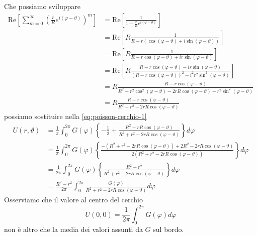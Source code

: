 \documentclass[10pt,a4paper,twoside,openright]{book}
\begin{document}
\begin{dimostrazione}
\begin{equation*}
\end{equation*}
Che possiamo sviluppare
\begin{align*}
\mathrm{Re}\left[\sum\limits ^{\infty }_{m=0}\left(\frac{r}{R} e^{i( \varphi -\vartheta)}\right)^{m}\right] & =\mathrm{Re}\left[\frac{1}{1-\frac{r}{R} e^{i( \varphi -\vartheta)}}\right]\\
 & =\mathrm{Re}\left[ R\frac{1}{R-r(\cos( \varphi -\vartheta) +i\sin( \varphi -\vartheta))}\right]\\
 & =\mathrm{Re}\left[ R\frac{1}{R-r\cos( \varphi -\vartheta) +ir\sin( \varphi -\vartheta)}\right]\\
 & =\mathrm{Re}\left[ R\frac{R-r\cos( \varphi -\vartheta) -ir\sin( \varphi -\vartheta)}{( R-r\cos( \varphi -\vartheta))^{2} -i^{2} r^{2}\sin^{2}( \varphi -\vartheta)}\right]\\
 & =R\frac{R-r\cos( \varphi -\vartheta)}{R^{2} +r^{2}\cos^{2}( \varphi -\vartheta) -2rR\cos( \varphi -\vartheta) +r^{2}\sin^{2}( \varphi -\vartheta)}\\
 & =R\frac{R-r\cos( \varphi -\vartheta)}{R^{2} +r^{2} -2rR\cos( \varphi -\vartheta)}
\end{align*}
possiamo sostituire nella \eqref{eq:poisson-cerchio-1}
\begin{align*}
U(r,\vartheta) & =\frac{1}{\pi }\int ^{2\pi }_{0} G(\varphi)\left\{-\frac{1}{2} +\frac{R^{2} -rR\cos( \varphi -\vartheta)}{R^{2} +r^{2} -2rR\cos( \varphi -\vartheta)}\right\} d\varphi \\
 & =\frac{1}{\pi }\int ^{2\pi }_{0} G(\varphi)\left\{\frac{-\left( R^{2} +r^{2} -2rR\cos( \varphi -\vartheta)\right) +2R^{2} -2rR\cos( \varphi -\vartheta)}{2\left( R^{2} +r^{2} -2rR\cos( \varphi -\vartheta)\right)}\right\} d\varphi \\
 & =\frac{1}{2\pi }\int ^{2\pi }_{0} G(\varphi)\left\{\frac{R^{2} -r^{2}}{R^{2} +r^{2} -2rR\cos( \varphi -\vartheta)}\right\} d\varphi \\
 & =\frac{R^{2} -r^{2}}{2\pi }\int ^{2\pi }_{0}\frac{G(\varphi)}{R^{2} +r^{2} -2rR\cos( \varphi -\vartheta)} d\varphi 
\end{align*}
Osserviamo che il valore al centro del cerchio
\begin{equation*}
U(0,0) =\frac{1}{2\pi }\int ^{2\pi }_{0} G(\varphi) d\varphi 
\end{equation*}
non è altro che la media dei valori assunti da $G$ sul bordo.


\end{dimostrazione}
\end{document}

